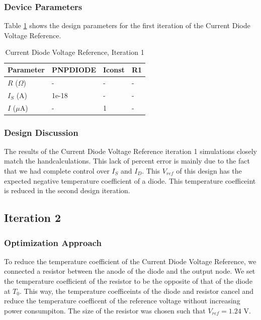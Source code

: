 \documentclass[conference]{IEEEtran}
\begin{document}
\subsubsection{Device Parameters}
Table \ref{tab:cm-dp-1} shows the design parameters for the first iteration of the Current Diode Voltage Reference.
\begin{table}[!htbp]
  \caption[]{Current Diode Voltage Reference, Iteration 1}
  \label{tab:cm-dp-1}
  \centering
  \begin{tabular}{|l|l|l|l|}
    \hline
    Parameter			& PNPDIODE	&Iconst	&R1	\\ \hline
    $R$ ($\Omega$)		&-			&-	&- 	\\ \hline
    $I_S$ (A)		&1e-18			&-	&-	\\ \hline
    $I$ ($\mu$A)	&-				&1	&-	\\
    \hline
  \end{tabular}
\end{table}
\subsubsection{Design Discussion}
The results of the Current Diode Voltage Reference iteration 1 simulations closely match the handcalculations.  This lack of percent error is mainly due to the fact that we had complete control over $I_S$ and $I_D$.  This $V_{ref}$ of this design has the expected negative temperature coefficient of a diode.  This temperature coefficeint is reduced in the second design iteration. 

\subsection{Iteration 2}
\subsubsection{Optimization Approach}
To reduce the temperature coefficient of the Current Diode Voltage Reference, we connected a resistor between the anode of the diode and the output node.  We set the temperature coefficient of the resistor to be the opposite of that of the diode at $T_0$.  This way, the temperature coefficeints of the diode and resistor cancel and reduce the temperature coefficent of the reference voltage without increasing power consumpiton.  The size of the resistor was chosen such that $V_{ref} = 1.24$ V.
\end{document}

